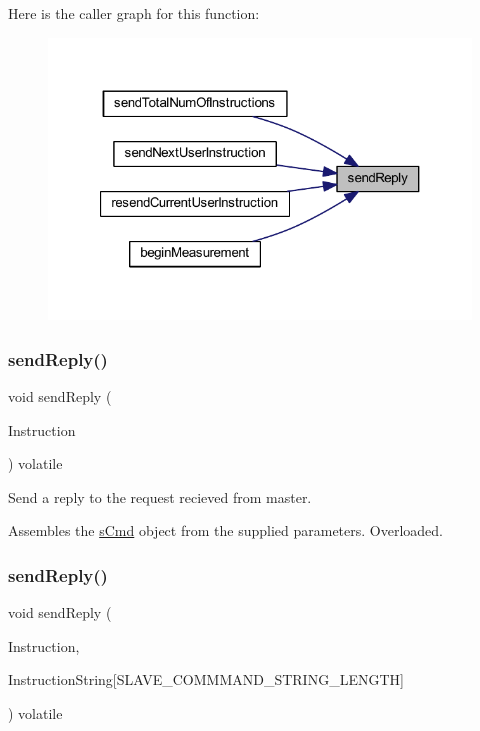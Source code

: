 Here is the caller graph for this function\+:
\nopagebreak
\begin{figure}[H]
\begin{center}
\leavevmode
\includegraphics[width=321pt]{class_master_a7d0570bae901dbbd7c88db131fea03c5_icgraph}
\end{center}
\end{figure}
\mbox{\label{class_master_a109e347c1b70f26a82d48dfb13af3fe8}} 
\subsubsection{\texorpdfstring{sendReply()}{sendReply()}\hspace{0.1cm}{\footnotesize\ttfamily [2/9]}}
{\footnotesize\ttfamily void send\+Reply (\begin{DoxyParamCaption}\item[{const \mbox{\hyperlink{_s_p_i___instruction_set_8h_a949ec019a0f52780dcdd7d5a5ba73e47}{s\+Instruct}}}]{Instruction }\end{DoxyParamCaption}) volatile}



Send a reply to the request recieved from master. 

Assembles the \mbox{\hyperlink{structs_cmd}{s\+Cmd}} object from the supplied parameters. Overloaded. \mbox{\label{class_master_abebea7ffc56886ac9b59980312ea19f9}} 
\subsubsection{\texorpdfstring{sendReply()}{sendReply()}\hspace{0.1cm}{\footnotesize\ttfamily [3/9]}}
{\footnotesize\ttfamily void send\+Reply (\begin{DoxyParamCaption}\item[{const \mbox{\hyperlink{_s_p_i___instruction_set_8h_a949ec019a0f52780dcdd7d5a5ba73e47}{s\+Instruct}}}]{Instruction,  }\item[{volatile char}]{Instruction\+String\mbox{[}\+S\+L\+A\+V\+E\+\_\+\+C\+O\+M\+M\+M\+A\+N\+D\+\_\+\+S\+T\+R\+I\+N\+G\+\_\+\+L\+E\+N\+G\+T\+H\mbox{]} }\end{DoxyParamCaption}) volatile}



